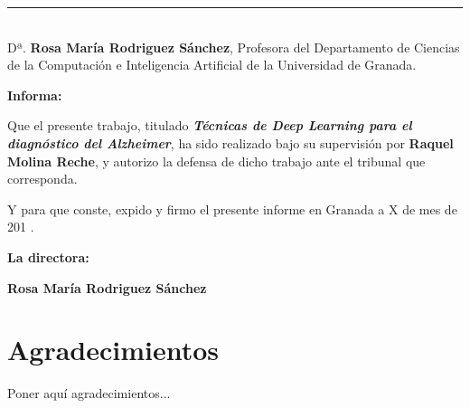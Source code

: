 \cleardoublepage
\thispagestyle{empty}

\noindent\rule[-1ex]{\textwidth}{2pt}\\[4.5ex]

Dª. \textbf{Rosa María Rodriguez Sánchez}, Profesora del Departamento de Ciencias de la Computación e Inteligencia Artificial de la Universidad de Granada.

\vspace{0.5cm}

\textbf{Informa:}

\vspace{0.5cm}

Que el presente trabajo, titulado \textit{\textbf{Técnicas de Deep Learning para el diagnóstico del Alzheimer}},
ha sido realizado bajo su supervisión por \textbf{Raquel Molina Reche}, y autorizo la defensa de dicho trabajo ante el tribunal
que corresponda.

\vspace{0.5cm}

Y para que conste, expido y firmo el presente informe en Granada a X de mes de 201 .

\vspace{1cm}

\textbf{La directora:}

\vspace{5cm}

\noindent \textbf{Rosa María Rodriguez Sánchez}

\chapter*{Agradecimientos}
\thispagestyle{empty}

       \vspace{1cm}


Poner aquí agradecimientos...

